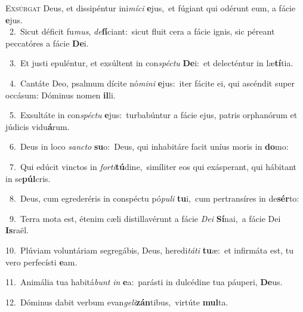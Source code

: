 \lettrine{\initial\textcolor{\initialcolor}{E}}{xsúrgat} Deus, et dissipéntur ini\-\textit{mí}\-\textit{ci} \textbf{e}\-jus,~\star et fúgiant qui odérunt eum, a fácie \textbf{e}\-jus.\\
{\numbfont\textcolor{\numbcolor}{~2.}}~Sicut déficit fu\-\textit{mus}\-, \textit{de}\-\textbf{fí}ciant:~\star sicut fluit cera a fácie ignis, sic péreant peccatóres a fácie \textbf{De}\-i.\par
{\numbfont\textcolor{\numbcolor}{~3.}}~Et justi epuléntur, et exsúltent in con\-\textit{spéc}\-\textit{tu} \textbf{De}\-i:~\star et delecténtur in læ\-\textbf{tí}\-tia.\par
{\numbfont\textcolor{\numbcolor}{~4.}}~Cantáte Deo, psalmum dícite nó\-\textit{mi}\-\textit{ni} \textbf{e}\-jus:~\star iter fácite ei, qui ascéndit super occásum: Dóminus nomen \textbf{il}\-li.\par
{\numbfont\textcolor{\numbcolor}{~5.}}~Exsultáte in con\-\textit{spéc}\-\textit{tu} \textbf{e}\-jus:~\star turbabúntur a fácie ejus, patris orphanórum et júdicis vidu\-\textbf{á}\-rum.\par
{\numbfont\textcolor{\numbcolor}{~6.}}~Deus in loco \textit{sanc}\-\textit{to} \textbf{su}\-o:~\star Deus, qui inhabitáre facit uníus moris in \textbf{do}\-mo:\par
{\numbfont\textcolor{\numbcolor}{~7.}}~Qui edúcit vinctos in \textit{for}\-\textit{ti}\textbf{tú}dine,~\star simíliter eos qui exásperant, qui hábitant in se\-\textbf{púl}\-cris.\par
{\numbfont\textcolor{\numbcolor}{~8.}}~Deus, cum egrederéris in conspéctu pó\-\textit{pu}\-\textit{li} \textbf{tu}\-i,~\star cum pertransíres in de\-\textbf{sér}\-to:\par
{\numbfont\textcolor{\numbcolor}{~9.}}~Terra mota est, étenim cæli distillavérunt a fácie \textit{De}\-\textit{i} \textbf{Sí}\-nai,~\star a fácie Dei \textbf{Is}\-raël.\par
{\numbfont\textcolor{\numbcolor}{10.}}~Plúviam voluntáriam segregábis, Deus, heredi\-\textit{tá}\-\textit{ti} \textbf{tu}\-æ:~\star et infirmáta est, tu vero perfecísti \textbf{e}\-am.\par
{\numbfont\textcolor{\numbcolor}{11.}}~Animália tua habitá\textit{bunt} \textit{in} \textbf{e}\-a:~\star parásti in dulcédine tua páuperi, \textbf{De}\-us.\par
{\numbfont\textcolor{\numbcolor}{12.}}~Dóminus dabit verbum evan\-\textit{ge}\-\textit{li}\textbf{zán}tibus,~\star virtúte \textbf{mul}\-ta.\par
